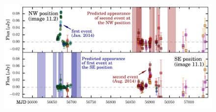 \documentclass{nature_arxiv}
\begin{document}
\begin{multicols}{2}
\begin{figure}[tbp]
  \begin{center}
    \includegraphics[width=\textwidth]{./figures/spock_predictions/spock_predictions}
    \caption{\protect}
  \end{center}
\end{figure}






\end{multicols}

\begin{methods}











\end{methods}






{}



\end{document}
